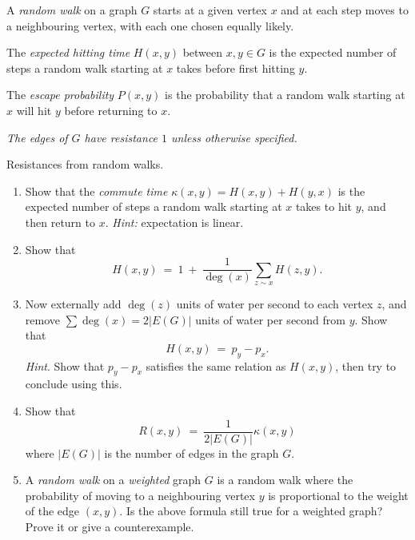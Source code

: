 \documentclass[11pt,fleqn]{book} %
\begin{document}
\begin{definition}
    A \emph{random walk} on a graph $G$ starts at a given vertex $x$ and at each step moves to a neighbouring vertex, with each one chosen equally likely.
\end{definition}


\begin{definition}
    The \textit{expected hitting time} $H(x,y)$ between $x,y\in G$ is the expected number of steps a random walk starting at $x$ takes before first hitting $y$.
\end{definition}



\begin{definition}
   The \emph{escape probability} $P(x,y)$ is the probability that a random walk starting at $x$ will hit $y$ before returning to $x$.
\end{definition}


\textit{The edges of $G$ have resistance $1$ unless otherwise specified.}


\begin{problem}
  Resistances from random walks.
  \begin{enumerate}[label =\alph*.]
   \item  Show that the \textit{commute time} $\kappa(x,y)=H(x,y)+H(y,x)$ is the expected number of steps a random walk starting at $x$ takes to hit $y$, and then return to $x$. \textit{Hint:} expectation is linear. 
   \item  Show that 
       $$H(x,y) \ = \ 1 \ + \ \frac{1}{\deg(x)}\sum_{z\sim x} H(z,y).$$
       \item  Now externally add $\deg(z)$ units of water per second to each vertex $z$, and remove $\sum \deg(x) = 2|E(G)|$ units of water per second from $y$. Show that 
       $$H(x,y) \ = \  p_y-p_x.$$
    \textit{Hint}. Show that $p_y-p_x$ satisfies the same relation as $H(x,y)$, then try to conclude using this.
   \item Show that 
    $$R(x,y) \ = \ \frac{1}{2|E(G)|} \kappa(x,y) $$
    where $|E(G)|$ is the number of edges in the graph $G$.
    
    
    \item   A \textit{random walk} on a \textit{weighted} graph $G$ is a random walk where the probability of moving to a neighbouring vertex $y$ is proportional to the weight of the edge $(x,y)$. Is the above formula still true for a weighted graph? Prove it or give a counterexample.
  \end{enumerate}
\end{problem}
\end{document}
